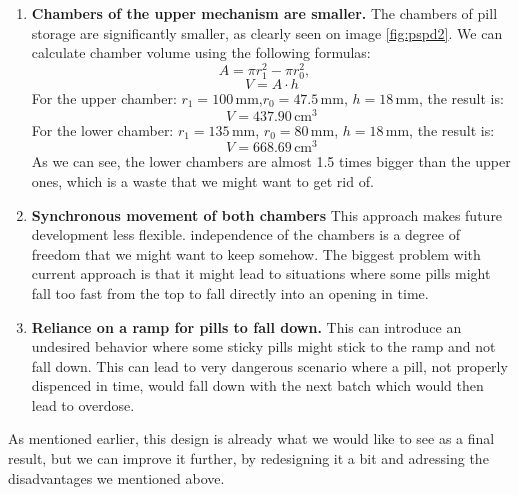 \begin{enumerate}
\item \textbf{Chambers of the upper mechanism are smaller.} The chambers of pill storage are significantly smaller, as clearly seen on image \ref{fig:pspd2}. We can calculate chamber volume using the following formulas:
\[
A = \pi r_1^2 - \pi r_0^2,\quad 
\]
\[
V = A \cdot h
\]
For the upper chamber: \( r_1 = 100\,\text{mm} \),\( r_0 = 47.5\,\text{mm} \), \( h = 18\,\text{mm} \), the result is:
\[
V = 437.90\,\text{cm}^3
\]
For the lower chamber:  \( r_1 = 135\,\text{mm} \), \( r_0 = 80\,\text{mm} \), \( h = 18\,\text{mm} \), the result is:
\[
V = 668.69\,\text{cm}^3
\]
As we can see, the lower chambers are almost 1.5 times bigger than the upper ones, which is a waste that we might want to get rid of.
	\item{\textbf{Synchronous movement of both chambers}} This approach makes future development less flexible. independence of the chambers is a degree of freedom that we might want to keep somehow. The biggest problem with current approach is that it might lead to situations where some pills might fall too fast from the top to fall directly into an opening in time.
	\item{\textbf{Reliance on a ramp for pills to fall down.}} This can introduce an undesired behavior where some sticky pills might stick to the ramp and not fall down. This can lead to very dangerous scenario where a pill, not properly dispenced in time, would fall down with the next batch which would then lead to overdose.
\end{enumerate}

As mentioned earlier, this design is already what we would like to see as a final result, but we can improve it further, by redesigning it a bit and adressing the disadvantages we mentioned above.
\newpage


